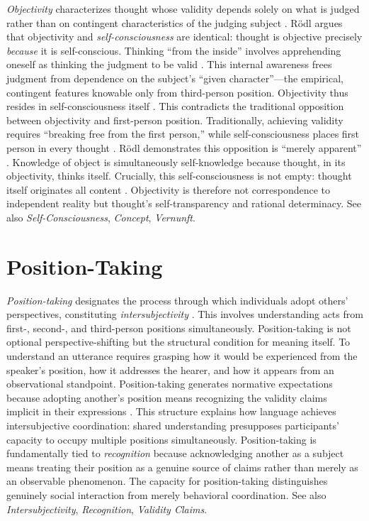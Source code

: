 \documentclass{book}
\begin{document}
\textit{Objectivity} characterizes thought whose validity depends solely on what is judged rather than on contingent characteristics of the judging subject \parencite{Rodl:2018aa}. R\"odl argues that objectivity and \textit{self-consciousness} are identical: thought is objective precisely \textit{because} it is self-conscious. Thinking ``from the inside'' involves apprehending oneself as thinking the judgment to be valid \parencite{Rodl:2018aa}. This internal awareness frees judgment from dependence on the subject's ``given character''---the empirical, contingent features knowable only from third-person position. Objectivity thus resides in self-consciousness itself \parencite[11]{Rodl:2018aa}. This contradicts the traditional opposition between objectivity and first-person position. Traditionally, achieving validity requires ``breaking free from the first person,'' while self-consciousness places first person in every thought \parencite[8]{Rodl:2018aa}. R\"odl demonstrates this opposition is ``merely apparent'' \parencite[11]{Rodl:2018aa}. Knowledge of object is simultaneously self-knowledge because thought, in its objectivity, thinks itself. Crucially, this self-consciousness is not empty: thought itself originates all content \parencite{Rodl:2019aa}. Objectivity is therefore not correspondence to independent reality but thought's self-transparency and rational determinacy. See also \textit{Self-Consciousness}, \textit{Concept}, \textit{Vernunft}.

\section{Position-Taking}

\textit{Position-taking} designates the process through which individuals adopt others' perspectives, constituting \textit{intersubjectivity} \parencite{Carspecken1999, Carspecken1995aa}. This involves understanding acts from first-, second-, and third-person positions simultaneously. Position-taking is not optional perspective-shifting but the structural condition for meaning itself. To understand an utterance requires grasping how it would be experienced from the speaker's position, how it addresses the hearer, and how it appears from an observational standpoint. Position-taking generates normative expectations because adopting another's position means recognizing the validity claims implicit in their expressions \parencite{Carspecken1999}. This structure explains how language achieves intersubjective coordination: shared understanding presupposes participants' capacity to occupy multiple positions simultaneously. Position-taking is fundamentally tied to \textit{recognition} because acknowledging another as a subject means treating their position as a genuine source of claims rather than merely as an observable phenomenon. The capacity for position-taking distinguishes genuinely social interaction from merely behavioral coordination. See also \textit{Intersubjectivity}, \textit{Recognition}, \textit{Validity Claims}.
\end{document}
